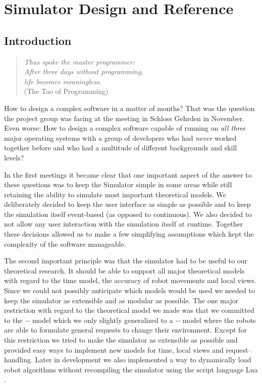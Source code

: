 
\chapter{Simulator Design and Reference}
\label{chap:IG}

\section{Introduction}\label{SG:sec:introduction}
\begin{quote}
	\textit{Thus spoke the master programmer:\\
	After three days without programming,\\
	life becomes meaningless.}\\[2mm]
	(The Tao of Programming)\medskip	
\end{quote}


\noindent
How to design a complex software in a matter of months? That was the question the project group was facing at the meeting in Schloss Gehrden in November. Even worse: How to design a complex software capable of running on \emph{all three} major operating systems with a group of developers who had \emph{never} worked together before and who had a multitude of different backgrounds and skill levels?\smallskip

\noindent
In the first meetings it became clear that one important aspect of the answer to these questions was to keep the Simulator simple in some areas while still retaining the ability to simulate most important theoretical models.
We deliberately decided to keep the user interface as simple as possible and to keep the simulation itself event-based (as opposed to continuous). We also decided to not allow any user interaction with the simulation itself at runtime. Together these decisions allowed us to make a few simplifying assumptions which kept the complexity of the software manageable.\smallskip

\noindent
The second important principle was that the simulator had to be useful to our theoretical research. It should be able to support all major theoretical models with regard to the time model, the accuracy of robot movements and local views. Since we could not possibly anticipate which models would be used we needed to keep the simulator as extensible and as modular as possible. The one major restriction with regard to the theoretical model we made was that we committed to the \emph{\Look-\Compute-\Move} model which we only slightly generalized to a \emph{\Look-\Compute-\HandleRequests} model where the robots are able to formulate general requests to change their environment. Except for this restriction we tried to make the simulator as extensible as possible and provided easy ways to implement new models for time, local views and request--handling. Later in development we also implemented a way to dynamically load robot algorithms without recompiling the simulator using the script language Lua \cite{reference:Lua}.\smallskip

